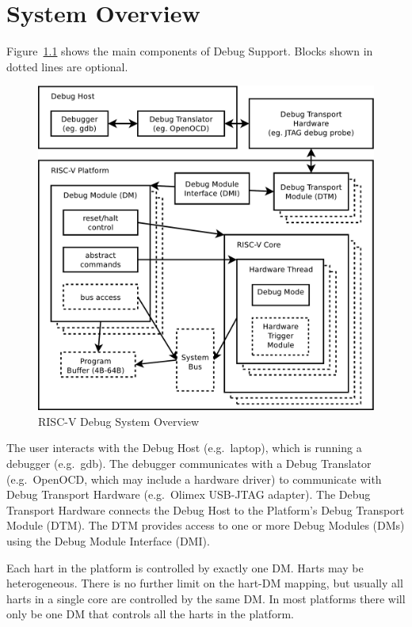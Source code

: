 \chapter{System Overview} \label{overview}

Figure~\ref{fig:overview} shows the main components of Debug Support.
Blocks shown in dotted lines are optional. 

\begin{figure}
   \centering
   \includegraphics[width=\textwidth]{fig/overview-eps-converted-to.pdf}
   \caption{RISC-V Debug System Overview}
   \label{fig:overview}
\end{figure}

The user interacts with the Debug Host (e.g.\ laptop), which is running a
debugger (e.g.\ gdb).  The debugger communicates with a Debug Translator (e.g.\ 
OpenOCD, which may include a hardware driver) to communicate with Debug
Transport Hardware (e.g.\ Olimex USB-JTAG adapter).
The Debug Transport Hardware connects the Debug Host to the Platform's Debug
Transport Module (DTM).  The DTM provides access to one or more Debug Modules
(DMs) using the Debug Module Interface (DMI).

Each hart in the platform is controlled by exactly one DM. Harts may be
heterogeneous. There is no further limit on the hart-DM mapping, but usually
all harts in a single core are controlled by the same DM. In most platforms there
will only be one DM that controls all the harts in the platform.

